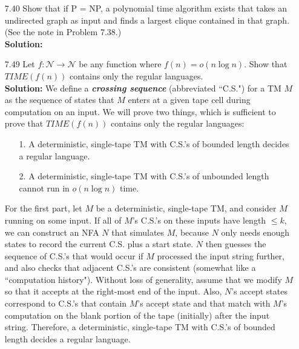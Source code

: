 \begin{enumerate}
\item[7.40]Show that if P = NP, a polynomial time algorithm exists that takes an undirected graph as input and finds a largest clique contained in that graph. (See the note in Problem 7.38.)
\\
\textbf{Solution:} \alreadyanswered

\item[7.49]Let $f: \mathcal{N} \rightarrow \mathcal{N}$ be any function where $f(n) = o(n \log n)$. Show that $TIME(f(n))$ contains only the regular languages.
\\
\textbf{Solution:} We define a \textbf{\emph{crossing sequence}} (abbreviated ``C.S.") for a TM $M$ as the sequence of states that $M$ enters at a given tape cell during computation on an input. We will prove two things, which is sufficient to prove that $TIME(f(n))$ contains only the regular languages:
\begin{enumerate}
\item[1.]A deterministic, single-tape TM with C.S.'s of bounded length decides a regular language.
\item[2.]A deterministic, single-tape TM with C.S.'s of unbounded length cannot run in $o(n \log n)$ time. 
\end{enumerate}

\par For the first part, let $M$ be a deterministic, single-tape TM, and consider $M$ running on some input. If all of $M$'s C.S.'s on these inputs have length $\le k$, we can construct an NFA $N$ that simulates $M$, because $N$ only needs enough states to record the current C.S. plus a start state. $N$ then guesses the sequence of C.S.'s that would occur if $M$ processed the input string further, and also checks that adjacent C.S.'s are consistent (somewhat like a ``computation history"). Without loss of generality, assume that we modify $M$ so that it accepts at the right-most end of the input. Also, $N$'s accept states correspond to C.S.'s that contain $M$'s accept state and that match with $M$'s computation on the blank portion of the tape (initially) after the input string. Therefore, a deterministic, single-tape TM with C.S.'s of bounded length decides a regular language.


\end{enumerate}
